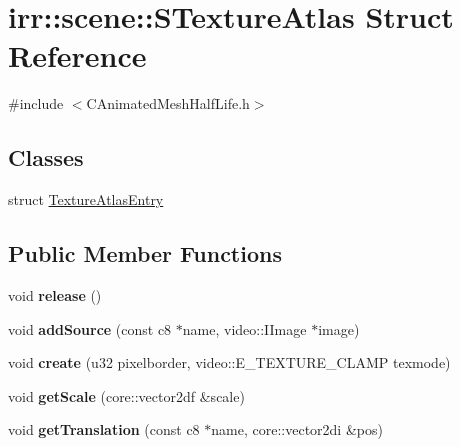 \hypertarget{structirr_1_1scene_1_1_s_texture_atlas}{\section{irr\-:\-:scene\-:\-:S\-Texture\-Atlas Struct Reference}
\label{structirr_1_1scene_1_1_s_texture_atlas}
}


{\ttfamily \#include $<$C\-Animated\-Mesh\-Half\-Life.\-h$>$}

\subsection*{Classes}
\begin{DoxyCompactItemize}
\item 
struct \hyperlink{structirr_1_1scene_1_1_s_texture_atlas_1_1_texture_atlas_entry}{Texture\-Atlas\-Entry}
\end{DoxyCompactItemize}
\subsection*{Public Member Functions}
\begin{DoxyCompactItemize}
\item 
\hypertarget{structirr_1_1scene_1_1_s_texture_atlas_ac918618b5e2d5f121c1a48a5d71ac83a}{void {\bfseries release} ()}\label{structirr_1_1scene_1_1_s_texture_atlas_ac918618b5e2d5f121c1a48a5d71ac83a}

\item 
\hypertarget{structirr_1_1scene_1_1_s_texture_atlas_acb47ab43cd70571e357567d2c6e22646}{void {\bfseries add\-Source} (const c8 $\ast$name, video\-::\-I\-Image $\ast$image)}\label{structirr_1_1scene_1_1_s_texture_atlas_acb47ab43cd70571e357567d2c6e22646}

\item 
\hypertarget{structirr_1_1scene_1_1_s_texture_atlas_a7349438098e25f38fbf7e01e60fc12a3}{void {\bfseries create} (u32 pixelborder, video\-::\-E\-\_\-\-T\-E\-X\-T\-U\-R\-E\-\_\-\-C\-L\-A\-M\-P texmode)}\label{structirr_1_1scene_1_1_s_texture_atlas_a7349438098e25f38fbf7e01e60fc12a3}

\item 
\hypertarget{structirr_1_1scene_1_1_s_texture_atlas_a75c3390353efe149b40101ae54c7f2b1}{void {\bfseries get\-Scale} (core\-::vector2df \&scale)}\label{structirr_1_1scene_1_1_s_texture_atlas_a75c3390353efe149b40101ae54c7f2b1}

\item 
\hypertarget{structirr_1_1scene_1_1_s_texture_atlas_a5e93b45ad1db6908e60032695a726340}{void {\bfseries get\-Translation} (const c8 $\ast$name, core\-::vector2di \&pos)}\label{structirr_1_1scene_1_1_s_texture_atlas_a5e93b45ad1db6908e60032695a726340}

\end{DoxyCompactItemize}
